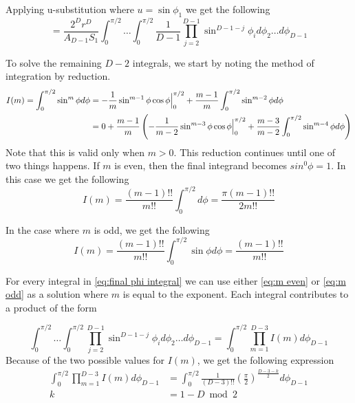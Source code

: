 \documentclass{article}
\begin{document}
Applying u-substitution where $u=\sin\phi_1$ we get the following
\begin{equation} \label{eq:final phi integral}
	= \frac{2^D r^D}{A_{D-1} S_1}\int_0^{\pi/2} \hdots \int_0^{\pi/2} \frac{1}{D-1} \prod_{j=2}^{D-1}\sin^{D-1-j}\phi_i d\phi_2\hdots d\phi_{D-1}
\end{equation}

To solve the remaining $D-2$ integrals, we start by noting the method of integration by reduction.
\begin{align}
	I(m) = \int_0^{\pi/2} \sin^m \phi d\phi &= -\frac{1}{m}\sin^{m-1}\phi \cos\phi \Big{|}_0^{\pi/2} + \frac{m-1}{m}\int_0^{\pi/2}\sin^{m-2}\phi d\phi\\
	&= 0 + \frac{m-1}{m}\left(-\frac{1}{m-2}\sin^{m-3}\phi \cos\phi \Big{|}_0^{\pi/2} + \frac{m-3}{m-2}\int_0^{\pi/2}\sin^{m-4}\phi d\phi\right)
\end{align}
Note that this is valid only when $m>0$. This reduction continues until one of two things happens. If $m$ is even, then the final integrand becomes $sin^0\phi = 1$. 
In this case we get the following
\begin{equation} \label{eq:m even}
	I(m) = \frac{(m-1)!!}{m!!}\int_0^{\pi/2} d\phi = \frac{\pi (m-1)!!}{2m!!}
\end{equation}

In the case where $m$ is odd, we get the following
\begin{equation} \label{eq:m odd}
	I(m) = \frac{(m-1)!!}{m!!}\int_0^{\pi/2}\sin\phi d\phi = \frac{(m-1)!!}{m!!}
\end{equation}

For every integral in \ref{eq:final phi integral} we can use either \ref{eq:m even} or \ref{eq:m odd} as a solution where $m$ is equal to the exponent. Each integral contributes
to a product of the form

\begin{equation}
	\int_0^{\pi/2} \hdots \int_0^{\pi/2} \prod_{j=2}^{D-1}\sin^{D-1-j}\phi_i d\phi_2\hdots d\phi_{D-1} = \int_0^{\pi/2}\prod_{m=1}^{D-3}I(m) d\phi_{D-1}
\end{equation}
Because of the two possible values for $I(m)$, we get the following expression
\begin{align} 	\int_0^{\pi/2}\prod_{m=1}^{D-3}I(m) d\phi_{D-1} &= \int_0^{\pi/2} \frac{1}{(D-3)!!}\left(\frac{\pi}{2}\right)^{\frac{D-3-k}{2}} d\phi_{D-1}\label{eq:reduction result}
\\ k&=1-D\bmod 2 
\end{align}
\end{document}
